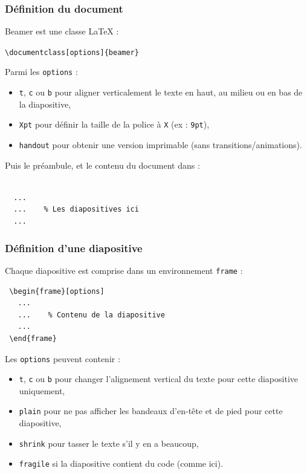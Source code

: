 \begin{frame}[fragile]
  \frametitle{Définition du document}

Beamer est une classe \LaTeX{} :

\lstinline?\documentclass[options]{beamer}?

\medskip
Parmi les \lstinline?options? :
\begin{itemize}
  \item \lstinline?t?, \lstinline?c? ou \lstinline?b? pour aligner verticalement le texte en haut, au milieu ou en bas de la diapositive,
  \item \lstinline?Xpt? pour définir la taille de la police à \lstinline?X? (ex : \lstinline?9pt?),
  \item \lstinline?handout? pour obtenir une version imprimable (sans transitions/animations).
\end{itemize}

\medskip
Puis le préambule, et le contenu du document dans :
\begin{lstlisting}

  ...
  ...    % Les diapositives ici
  ...

\end{lstlisting}
\end{frame}



\begin{frame}[fragile]
  \frametitle{Définition d'une diapositive}

Chaque diapositive est comprise dans un environnement \lstinline?frame? :

\begin{lstlisting}
 \begin{frame}[options]
   ...
   ...    % Contenu de la diapositive
   ...
 \end{frame}
\end{lstlisting}

\medskip
Les \lstinline?options? peuvent contenir :
\begin{itemize}
  \item \lstinline?t?, \lstinline?c? ou \lstinline?b? pour changer l'alignement vertical du texte pour cette diapositive uniquement,
  \item \lstinline?plain? pour ne pas afficher les bandeaux d'en-tête et de pied pour cette diapositive,
  \item \lstinline?shrink? pour tasser le texte s'il y en a beaucoup,
  \item \lstinline?fragile? si la diapositive contient du code (comme ici).
\end{itemize}
\end{frame}



